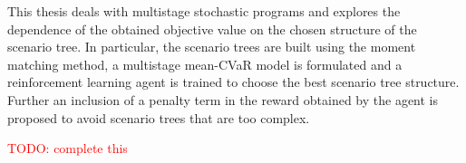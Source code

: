 \documentclass[12pt]{report}
\begin{document}

This thesis deals with multistage stochastic programs and explores the dependence of the obtained objective value on the chosen structure of the scenario tree. In particular, the scenario trees are built using the moment matching method, a multistage mean-CVaR model is formulated and a reinforcement learning agent is trained to choose the best scenario tree structure. Further an inclusion of a penalty term in the reward obtained by the agent is proposed to avoid scenario trees that are too complex.

\textcolor{red}{TODO: complete this}
\end{document}
